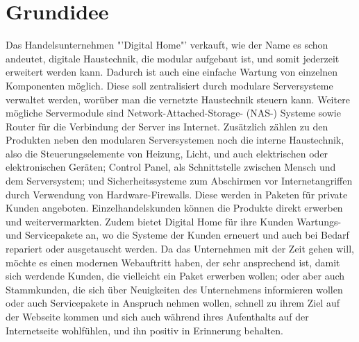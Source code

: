\section{Grundidee}

Das Handelsunternehmen "'Digital Home"' verkauft, wie der Name es schon andeutet, digitale Haustechnik, die modular aufgebaut ist, und somit jederzeit erweitert werden kann. Dadurch ist auch eine einfache Wartung von einzelnen Komponenten möglich. Diese soll zentralisiert durch modulare Serversysteme verwaltet werden, worüber man die vernetzte Haustechnik steuern kann. Weitere mögliche Servermodule sind Network-Attached-Storage- (NAS-) Systeme sowie Router für die Verbindung der Server ins Internet. Zusätzlich zählen zu den Produkten neben den modularen Serversystemen noch die interne Haustechnik, also die Steuerungselemente von Heizung, Licht, und auch elektrischen oder elektronischen Geräten; Control Panel, als Schnittstelle zwischen Mensch und dem Serversystem; und Sicherheitssysteme zum Abschirmen vor Internetangriffen durch Verwendung von Hardware-Firewalls. Diese werden in Paketen für private Kunden angeboten.  
Einzelhandelskunden können die Produkte direkt erwerben und weitervermarkten. Zudem bietet Digital Home für ihre Kunden Wartungs- und Servicepakete an, wo die Systeme der Kunden erneuert und auch bei Bedarf repariert oder ausgetauscht werden.
\newline
\newline
Da das Unternehmen mit der Zeit gehen will, möchte es einen modernen Webauftritt haben, der sehr ansprechend ist, damit sich werdende Kunden, die vielleicht ein Paket erwerben wollen; oder aber auch Stammkunden, die sich über Neuigkeiten des Unternehmens informieren wollen oder auch Servicepakete in Anspruch nehmen wollen, schnell zu ihrem Ziel auf der Webseite kommen und sich auch während ihres Aufenthalts auf der Internetseite wohlfühlen, und ihn positiv in Erinnerung behalten.
